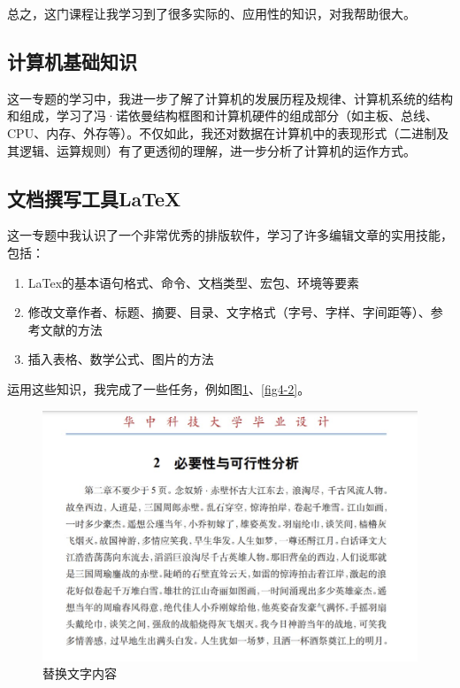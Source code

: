 \documentclass[supercite]{Experimental_Report}
\theoremstyle{definition}
\begin{document}
	总之，这门课程让我学习到了很多实际的、应用性的知识，对我帮助很大。
	
	\subsection{计算机基础知识}
	
	这一专题的学习中，我进一步了解了计算机的发展历程及规律、计算机系统的结构和组成，学习了冯·诺依曼结构框图和计算机硬件的组成部分（如主板、总线、CPU、内存、外存等）。不仅如此，我还对数据在计算机中的表现形式（二进制及其逻辑、运算规则）有了更透彻的理解，进一步分析了计算机的运作方式。
	
	\subsection{文档撰写工具LaTeX}
	
	这一专题中我认识了一个非常优秀的排版软件，学习了许多编辑文章的实用技能，包括：
	
	\begin{enumerate}
		\renewcommand{\labelenumi}{\theenumi)}
		\item LaTex的基本语句格式、命令、文档类型、宏包、环境等要素
		\item 修改文章作者、标题、摘要、目录、文字格式（字号、字样、字间距等）、参考文献的方法
		\item 插入表格、数学公式、图片的方法
	\end{enumerate}
	
	运用这些知识，我完成了一些任务，例如图\ref{fig4-1}、\ref{fig4-2}。
	
	\begin{figure}[htb]
		\begin{center}
			\includegraphics[scale=0.8]{images/4-1.jpg}
			\caption{替换文字内容}
			\label{fig4-1}
		\end{center}
	\end{figure}
\end{document}
